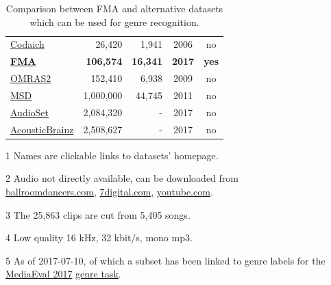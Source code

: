 \documentclass{article}
\newcommand{\ntracks}{106,574 }
\newcommand{\nartists}{16,341 }
\newcommand{\weblink}{https://github.com/mdeff/fma}
\begin{document}
\begin{table}[t]
\begin{threeparttable}
\begin{tabular}{l@{ }rrcc}
		\href{http://jmir.sourceforge.net/index_Codaich.html}{Codaich} \cite{codaich} & 26,420 & 1,941 & 2006 & no \\ %
		\bf \href{\weblink}{FMA} & \bf \ntracks & \bf \nartists & \bf 2017 & \bf yes \\
		\href{http://www.omras2.org/}{OMRAS2} \cite{omras} & 152,410 & 6,938 & 2009 & no \\
		\href{https://labrosa.ee.columbia.edu/millionsong/}{MSD} \cite{msd} & 1,000,000 & 44,745 & 2011 & no\tnote{2} \\
		\href{https://research.google.com/audioset/}{AudioSet} \cite{audioset} & 2,084,320 & - & 2017 & no\tnote{2} \\
		\href{https://acousticbrainz.org}{AcousticBrainz} \cite{acousticbrainz} & 2,508,627\tnote{5} & - & 2017 & no \\
		\bottomrule
	\end{tabular}
	\begin{tablenotes}
		\item[1] Names are clickable links to datasets' homepage.
		\item[2] Audio not directly available, can be downloaded from \\ \href{http://www.ballroomdancers.com}{ballroomdancers.com}, \href{https://www.7digital.com}{7digital.com}, \href{https://www.youtube.com}{youtube.com}.
		\item[3] The 25,863 clips are cut from 5,405 songs.
		\item[4] Low quality 16 kHz, 32 kbit/s, mono mp3.
		\item[5] As of 2017-07-10, of which a subset has been linked to genre labels for the \href{http://www.multimediaeval.org/mediaeval2017}{MediaEval 2017} \href{https://multimediaeval.github.io/2017-AcousticBrainz-Genre-Task}{genre task}.
	\end{tablenotes}
	\end{threeparttable}
	\caption{Comparison between FMA and alternative datasets which can be used for genre recognition.}
	\label{tab:datasets}
\end{table}
\end{document}
